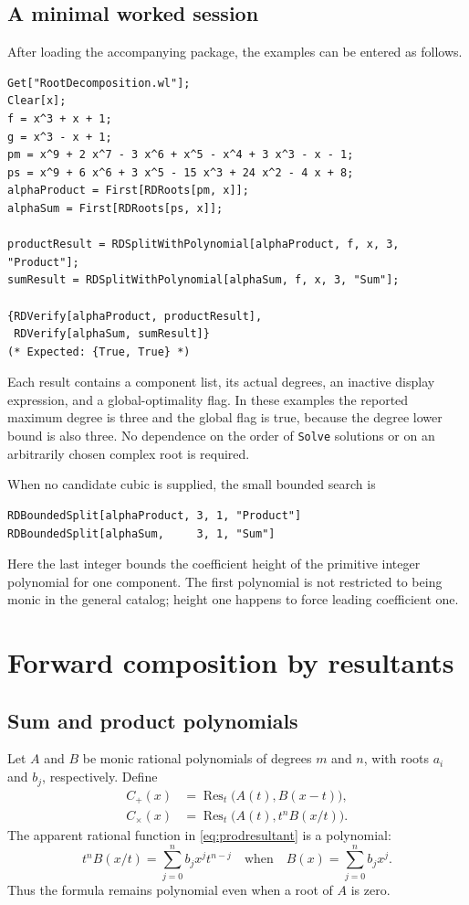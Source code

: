 \documentclass[11pt,letterpaper]{article}
\theoremstyle{definition}
\newcommand{\Res}{\operatorname{Res}}
\newcommand{\code}[1]{\texttt{#1}}
\begin{document}
\subsection{A minimal worked session}
After loading the accompanying package, the examples can be entered as follows.
\begin{samepage}
\begin{lstlisting}
Get["RootDecomposition.wl"];
Clear[x];
f = x^3 + x + 1;
g = x^3 - x + 1;
pm = x^9 + 2 x^7 - 3 x^6 + x^5 - x^4 + 3 x^3 - x - 1;
ps = x^9 + 6 x^6 + 3 x^5 - 15 x^3 + 24 x^2 - 4 x + 8;
alphaProduct = First[RDRoots[pm, x]];
alphaSum = First[RDRoots[ps, x]];

productResult = RDSplitWithPolynomial[alphaProduct, f, x, 3, "Product"];
sumResult = RDSplitWithPolynomial[alphaSum, f, x, 3, "Sum"];

{RDVerify[alphaProduct, productResult],
 RDVerify[alphaSum, sumResult]}
(* Expected: {True, True} *)
\end{lstlisting}
\end{samepage}
Each result contains a component list, its actual degrees, an inactive display expression, and a global-optimality flag. In these examples the reported maximum degree is three and the global flag is true, because the degree lower bound is also three. No dependence on the order of \code{Solve} solutions or on an arbitrarily chosen complex root is required.

When no candidate cubic is supplied, the small bounded search is
\begin{samepage}
\begin{lstlisting}
RDBoundedSplit[alphaProduct, 3, 1, "Product"]
RDBoundedSplit[alphaSum,     3, 1, "Sum"]
\end{lstlisting}
\end{samepage}
Here the last integer bounds the coefficient height of the primitive integer polynomial for one component. The first polynomial is not restricted to being monic in the general catalog; height one happens to force leading coefficient one.

\section{Forward composition by resultants}
\subsection{Sum and product polynomials}
Let $A$ and $B$ be monic rational polynomials of degrees $m$ and $n$, with roots $a_i$ and $b_j$, respectively. Define
\begin{align}
 C_+(x)&=\Res_t\bigl(A(t),B(x-t)\bigr),\label{eq:sumresultant}\\
 C_{\times}(x)&=\Res_t\bigl(A(t),t^nB(x/t)\bigr).\label{eq:prodresultant}
\end{align}
The apparent rational function in \eqref{eq:prodresultant} is a polynomial:
\[
 t^nB(x/t)=\sum_{j=0}^{n} b_jx^jt^{n-j}
 \quad\text{when}\quad B(x)=\sum_{j=0}^{n}b_jx^j.
\]
Thus the formula remains polynomial even when a root of $A$ is zero.
\end{document}
